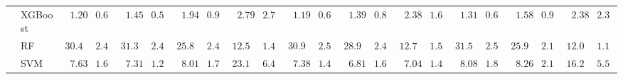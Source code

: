 \begin{tabular}{p{0.2cm}p{1cm}|p{0.6cm}p{0.6cm}|p{0.6cm}p{0.6cm}p{0.6cm}p{0.6cm}p{0.6cm}p{0.6cm}|p{0.6cm}p{0.6cm}p{0.6cm}p{0.6cm}p{0.6cm}p{0.6cm}|p{0.6cm}p{0.6cm}p{0.6cm}p{0.6cm}p{0.6cm}p{0.6cm}}
 & XGBoost  & $\phantom{0}1.20$ & $0.62$ & $\phantom{0}1.45$ & $0.58$ & $\phantom{0}1.94$ & $0.93$ & $\phantom{0}2.79$ & $2.75$ & $\phantom{0}1.19$ & $0.63$ & $\phantom{0}1.39$ & $0.81$ & $\phantom{0}2.38$ & $1.67$ & $\phantom{0}1.31$ & $0.68$ & $\phantom{0}1.58$ & $0.93$ & $\phantom{0}2.38$ & $2.31$ \\
 & RF  & $30.43$ & $2.48$ & $31.36$ & $2.45$ & $25.82$ & $2.40$ & $12.51$ & $1.40$ & $30.99$ & $2.50$ & $28.96$ & $2.45$ & $12.74$ & $1.55$ & $31.58$ & $2.59$ & $25.90$ & $2.14$ & $12.03$ & $1.13$ \\
 & SVM  & $\phantom{0}7.63$ & $1.64$ & $\phantom{0}7.31$ & $1.26$ & $\phantom{0}8.01$ & $1.73$ & $23.11$ & $6.48$ & $\phantom{0}7.38$ & $1.43$ & $\phantom{0}6.81$ & $1.61$ & $\phantom{0}7.04$ & $1.42$ & $\phantom{0}8.08$ & $1.85$ & $\phantom{0}8.26$ & $2.11$ & $16.28$ & $5.51$ \\
\hline 
\end{tabular}

